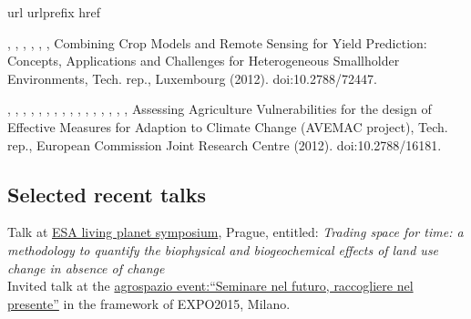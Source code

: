 \documentclass[11pt, a4paper]{article} %
\newcommand{\years}[1]{\marginnote{\scriptsize #1}} %
\begin{document}
\begingroup
\renewcommand{\section}[2]{}%
\begin{thebibliography}{1}
\expandafter\ifx\csname url\endcsname\relax
  \def\url#1{\texttt{#1}}\fi
\expandafter\ifx\csname urlprefix\endcsname\relax\def\urlprefix{URL }\fi
\expandafter\ifx\csname href\endcsname\relax
  \def\href#1#2{#2} \def\path#1{#1}\fi

, , ,
  , ,
  , {Combining Crop Models and Remote Sensing for Yield
  Prediction: Concepts, Applications and Challenges for Heterogeneous
  Smallholder Environments}, Tech. rep., Luxembourg (2012).
\newblock \href {http://dx.doi.org/10.2788/72447} {\path{doi:10.2788/72447}}.

, ,
  , ,
  , ,
  , , ,
  , , ,
  , , ,
  ,
  \href{http://mars.jrc.ec.europa.eu/mars/Projects/AVEMAC}{{Assessing
  Agriculture Vulnerabilities for the design of Effective Measures for Adaption
  to Climate Change (AVEMAC project)}}, Tech. rep., European Commission Joint
  Research Centre (2012).
\newblock \href {http://dx.doi.org/10.2788/16181} {\path{doi:10.2788/16181}}.

\end{thebibliography}
\endgroup


\subsection*{Selected recent talks}

\years{\raggedleft11/05/2016} Talk at \href{http://lps16.esa.int}{ESA living planet symposium}, Prague, entitled: \textit{Trading space for time: a methodology to quantify the biophysical and biogeochemical effects of land use change in absence of change}\\

\years{\raggedleft18/10/2015} Invited talk at the \href{http://www.enea.it/it/comunicare-la-ricerca/events/agrospazio_18ott15/Programma_18ottobre_al12.10.2015cc.pdf}{agrospazio event:``Seminare nel futuro, raccogliere nel presente''} in the framework of EXPO2015, Milano.\\
\end{document}
